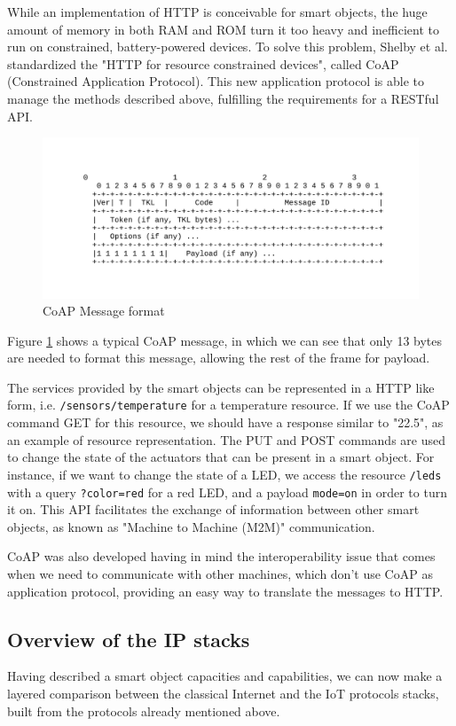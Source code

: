 While an implementation of HTTP is conceivable for smart objects, the huge amount of memory in both RAM and ROM turn it too heavy and inefficient to run on constrained, battery-powered devices\cite{Shelby10EWS}.
To solve this problem, Shelby et al. standardized the "HTTP for resource constrained devices"\cite{rfc7252}, called CoAP (Constrained Application Protocol).
This new application protocol is able to manage the methods described above, fulfilling the requirements for a RESTful API.
\begin{figure}[htb]
	\centering
	\includegraphics[width=1\columnwidth]{chapters/background.images/CoAPMessageFormat.pdf}
	\caption{CoAP Message format}
	\label{fig:CoAPMessageFormat}
\end{figure}
Figure \ref{fig:CoAPMessageFormat} shows a typical CoAP message, in which we can see that only 13 bytes are needed to format this message, allowing the rest of the frame for payload.

The services provided by the smart objects can be represented in a HTTP like form, i.e. \texttt{/sensors/temperature} for a temperature resource. If we use the CoAP command GET for this resource, we should have a response similar to "22.5", as an example of resource representation.
The PUT and POST commands are used to change the state of the actuators that can be present in a smart object.
For instance, if we want to change the state of a LED, we access the resource \texttt{/leds} with a query \texttt{?color=red} for a red LED, and a payload \texttt{mode=on} in order to turn it on.
This API facilitates the exchange of information between other smart objects, as known as "Machine to Machine (M2M)" communication.

CoAP was also developed having in mind the interoperability issue that comes when we need to communicate with other machines, which don't use CoAP as application protocol, providing an easy way to translate the messages to HTTP.

\subsection{Overview of the IP stacks}
Having described a smart object capacities and capabilities, we can now make a layered comparison between the classical Internet and the IoT protocols stacks, built from the protocols already mentioned above.

